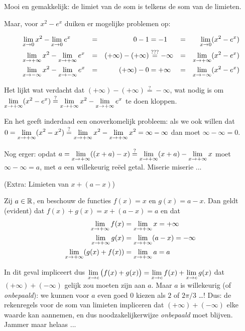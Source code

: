 \documentclass{ximera}
\begin{document}
\begin{example}
	Mooi en gemakkelijk: de limiet van de som is telkens de som van de limieten.
	
	Maar, voor $x^2 - e^x$ duiken er mogelijke problemen op:
	
	\begin{align*}	
	&\limx x^2 - \limx e^x  &=&& 0 - 1 &= -1 &=&& \limx (x^2-e^x) \\
	&\limxi x^2 - \limxi e^x  &=&& (+\infty)-(+\infty) &\overset{???}{=} -\infty &=&& \limxi (x^2-e^x)  \\
	&\limxmi x^2 - \limxmi e^x  &=&& (+\infty)-0  &=  +\infty &=&& \limxmi (x^2-e^x)
	\end{align*}
	
	Het lijkt wat verdacht dat $(+\infty) - (+\infty)  \overset{?}{=} -\infty$, wat nodig is om $\limxi (x^2-e^x)  \overset{?}{=} \limxi x^2  - \limxi e^x$ te doen kloppen.  
	
	En het geeft inderdaad een onoverkomelijk probleem: als we ook willen dat $0 = \limxi (x^2  - x^2)  \overset{?}{=} \limxi x^2  - \limxi x^2  = \infty - \infty$  dan moet $\infty - \infty = 0$. 
	
	Nog erger: opdat $a = \limxi ((x+a) - x) \overset{?}{=} \limxi (x+a) - \limxi x$ moet $\infty - \infty = a$, met $a$ een willekeurig reëel getal. Miserie miserie ...  

\end{example}
\begin{example}(Extra: Limieten van $x + (a-x)$)
	
	Zij $a\in\mathbb{R}$, en beschouw de functies $f(x)=x$ en $g(x)=a-x$. Dan geldt (evident) dat $f(x)+g(x)=x+(a-x)=a$ en dat 
	\begin{align*}
	\limxi f(x) & = \limxi x = +\infty \\
	\limxi g(x) & = \limxi (a-x) = -\infty \\
	\limxi (g(x)+f(x)) & = \limxi a = a \\
	\end{align*}
	
	{
	\centering
	}
	
	In dit geval impliceert dus $\limxc \big(f(x) +g(x)\big) = \limxc f(x) + \limxc g(x)$ dat $(+\infty) + (-\infty)$ gelijk zou moeten zijn aan $a$. Maar $a$ is willekeurig (of \textit{onbepaald}): we kunnen voor $a$ even goed $0$ kiezen als $2$ of $2\pi/3$ \dots! Dus: de rekenregels voor de som van limieten impliceren dat $(+\infty)+(-\infty)$ elke waarde kan aannemen, en dus noodzakelijkerwijze \textit{onbepaald} moet blijven. Jammer maar helaas ...
	
	
\end{example}
\end{document}

